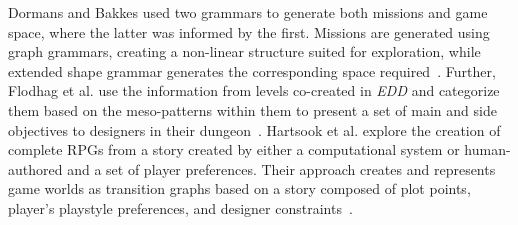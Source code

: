 

Dormans and Bakkes used two grammars to generate both missions and game space, where the latter was informed by the first. Missions are generated using graph grammars, creating a non-linear structure suited for exploration, while extended shape grammar generates the corresponding space required~\cite{p8dormans2011generating}. Further, Flodhag et al. use the information from levels co-created in \emph{EDD} and categorize them based on the meso-patterns within them to present a set of main and side objectives to designers in their dungeon~\cite{p8flodtol2020-WIPMakeSenseDungs}. Hartsook et al. explore the creation of complete RPGs from a story created by either a computational system or human-authored and a set of player preferences. Their approach creates and represents game worlds as transition graphs based on a story composed of plot points, player's playstyle preferences, and designer constraints~\cite{p8hartsook2011-storyWorlds}. 








